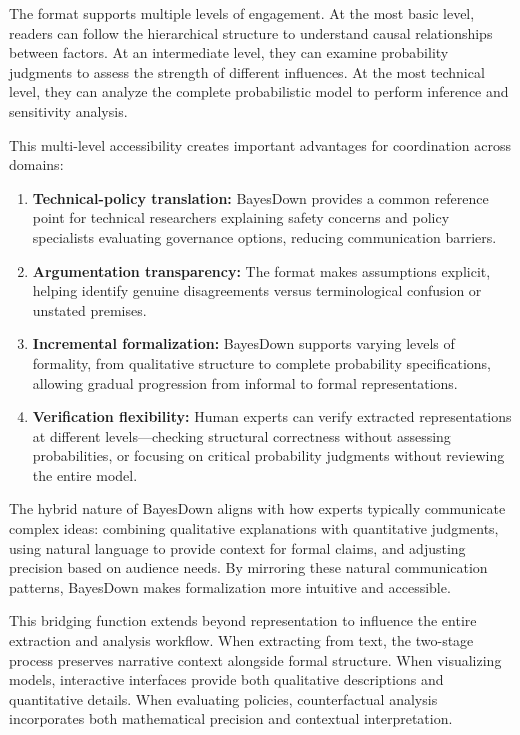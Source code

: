 \documentclass[
  11pt,
  letterpaper,
]{book}
\begin{document}
\begin{landscape}
The format supports multiple levels of engagement. At the most basic
level, readers can follow the hierarchical structure to understand
causal relationships between factors. At an intermediate level, they can
examine probability judgments to assess the strength of different
influences. At the most technical level, they can analyze the complete
probabilistic model to perform inference and sensitivity analysis.

This multi-level accessibility creates important advantages for
coordination across domains:

\begin{enumerate}
\def\labelenumi{\arabic{enumi}.}
\item
  \textbf{Technical-policy translation:} BayesDown provides a common
  reference point for technical researchers explaining safety concerns
  and policy specialists evaluating governance options, reducing
  communication barriers.
\item
  \textbf{Argumentation transparency:} The format makes assumptions
  explicit, helping identify genuine disagreements versus terminological
  confusion or unstated premises.
\item
  \textbf{Incremental formalization:} BayesDown supports varying levels
  of formality, from qualitative structure to complete probability
  specifications, allowing gradual progression from informal to formal
  representations.
\item
  \textbf{Verification flexibility:} Human experts can verify extracted
  representations at different levels---checking structural correctness
  without assessing probabilities, or focusing on critical probability
  judgments without reviewing the entire model.
\end{enumerate}

The hybrid nature of BayesDown aligns with how experts typically
communicate complex ideas: combining qualitative explanations with
quantitative judgments, using natural language to provide context for
formal claims, and adjusting precision based on audience needs. By
mirroring these natural communication patterns, BayesDown makes
formalization more intuitive and accessible.

This bridging function extends beyond representation to influence the
entire extraction and analysis workflow. When extracting from text, the
two-stage process preserves narrative context alongside formal
structure. When visualizing models, interactive interfaces provide both
qualitative descriptions and quantitative details. When evaluating
policies, counterfactual analysis incorporates both mathematical
precision and contextual interpretation.


\end{landscape}
\end{document}
